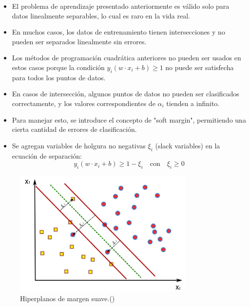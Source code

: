 \begin{itemize}
	\item El problema de aprendizaje presentado anteriormente es válido solo para datos linealmente separables, lo cual es raro en la vida real.
	\item En muchos casos, los datos de entrenamiento tienen intersecciones y no pueden ser separados linealmente sin errores.
	\item Los métodos de programación cuadrática anteriores no pueden ser usados en estos casos porque la condición $ y_i ( w \cdot x_i + b ) \geq 1 $ no puede ser satisfecha para todos los puntos de datos.
	\item En casos de intersección, algunos puntos de datos no pueden ser clasificados correctamente, y los valores correspondientes de $ \alpha_i $ tienden a infinito.
	\item Para manejar esto, se introduce el concepto de "soft margin", permitiendo una cierta cantidad de errores de clasificación.
	\item Se agregan variables de holgura no negativas $ \xi_i $ (slack variables) en la ecuación de separación:
	\[
	y_i ( w \cdot x_i + b ) \geq 1 - \xi_i \quad \text{con} \quad \xi_i \geq 0
	\]
\end{itemize}
 \begin{figure}[H]
	\begin{center}
		\includegraphics[width=0.8\textwidth]{2/figures/svm3.jpeg}
		\caption{Hiperplanos de margen suave.(\cite{tecnica3})}
	\end{center}
\end{figure}

